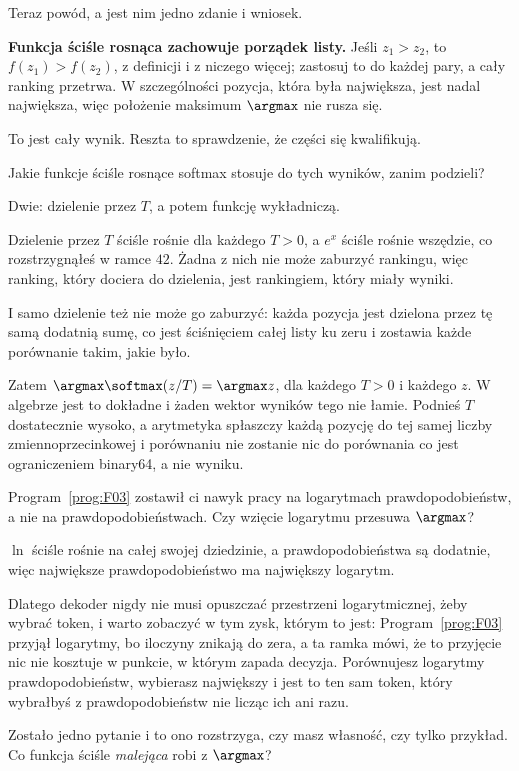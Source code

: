 \begin{fr}
Teraz powód, a jest nim jedno zdanie i wniosek.

\textbf{Funkcja ściśle rosnąca zachowuje porządek listy.} Jeśli $z_1 > z_2$, to
$f(z_1) > f(z_2)$, z definicji i z niczego więcej; zastosuj to do każdej pary,
a cały ranking przetrwa. W szczególności pozycja, która była największa, jest
nadal największa, więc położenie maksimum \dash{} $\argmax$ \dash{} nie rusza
się.

To jest cały wynik. Reszta to sprawdzenie, że części się kwalifikują.

Jakie funkcje ściśle rosnące softmax stosuje do tych wyników, zanim podzieli?
\nextframe
\end{fr}

\begin{fr}
\begin{ansblock}
Dwie: dzielenie przez $T$, a potem funkcję wykładniczą.
\end{ansblock}

Dzielenie przez $T$ ściśle rośnie dla każdego $T > 0$, a $e^{x}$ ściśle rośnie
wszędzie, co rozstrzygnąłeś w ramce $42$. Żadna z nich nie może zaburzyć
rankingu, więc ranking, który dociera do dzielenia, jest rankingiem, który
miały wyniki.

I samo dzielenie też nie może go zaburzyć: każda pozycja jest dzielona przez tę
samą dodatnią sumę, co jest ściśnięciem całej listy ku zeru i zostawia każde
porównanie takim, jakie było.

Zatem $\argmax \softmax(z / T) = \argmax z$, dla każdego $T > 0$ i każdego $z$.
W algebrze jest to dokładne i żaden wektor wyników tego nie łamie. Podnieś $T$
dostatecznie wysoko, a arytmetyka spłaszczy każdą pozycję do tej samej liczby
zmiennoprzecinkowej i porównaniu nie zostanie nic do porównania \dash{} co jest
ograniczeniem binary64, a nie wyniku.

Program~\ref{prog:F03} zostawił ci nawyk pracy na logarytmach
prawdopodobieństw, a nie na prawdopodobieństwach. Czy wzięcie logarytmu
przesuwa $\argmax$?
\nextframe
\end{fr}

\begin{fr}
$\ln$ ściśle rośnie na całej swojej dziedzinie, a prawdopodobieństwa są
dodatnie, więc największe prawdopodobieństwo ma największy logarytm.

Dlatego dekoder nigdy nie musi opuszczać przestrzeni logarytmicznej, żeby
wybrać token, i warto zobaczyć w tym zysk, którym to jest:
Program~\ref{prog:F03} przyjął logarytmy, bo iloczyny znikają do zera, a ta
ramka mówi, że to przyjęcie nic nie kosztuje w punkcie, w którym zapada
decyzja. Porównujesz logarytmy prawdopodobieństw, wybierasz największy i jest
to ten sam token, który wybrałbyś z prawdopodobieństw \dash{} nie licząc ich
ani razu.

Zostało jedno pytanie i to ono rozstrzyga, czy masz własność, czy tylko
przykład. Co funkcja ściśle \emph{malejąca} robi z $\argmax$?
\nextframe
\end{fr}

